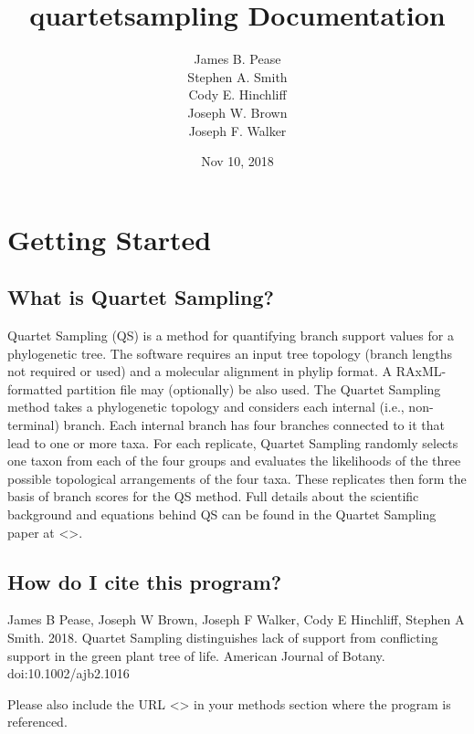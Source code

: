 \documentclass[letterpaper,12pt,english]{sphinxmanual}
\title{quartetsampling Documentation}
\date{Nov 10, 2018}
\author{James B. Pease \\ Stephen A. Smith \\ Cody E. Hinchliff \\Joseph W. Brown \\ Joseph F. Walker}
\begin{document}
\maketitle
\sphinxtableofcontents
{}\label{\detokenize{index::doc}}



\chapter{Getting Started}
\label{\detokenize{intro:intro}}\label{\detokenize{intro:getting-started}}\label{\detokenize{intro::doc}}\label{\detokenize{intro:manual-for-quartetsampling}}

\section{What is Quartet Sampling?}
\label{\detokenize{intro:what-is-quartet-sampling}}
Quartet Sampling (QS) is a method for quantifying branch support values for a phylogenetic tree.  The software requires an input tree topology (branch lengths not required or used) and a molecular alignment in phylip format.  A RAxML-formatted partition file may (optionally) be also used.  The Quartet Sampling method takes a phylogenetic topology and considers each internal (i.e., non-terminal) branch.  Each internal branch has four branches connected to it that lead to one or more taxa.  For each replicate, Quartet Sampling randomly selects one taxon from each of the four groups and evaluates the likelihoods of the three possible topological arrangements of the four taxa.  These replicates then form the basis of branch scores for the QS method.  Full details about the scientific background and equations behind QS can be found in the Quartet Sampling paper at \textless{}\textgreater{}.


\section{How do I cite this program?}
\label{\detokenize{intro:how-do-i-cite-this-program}}
James B Pease, Joseph W Brown, Joseph F Walker, Cody E Hinchliff, Stephen A Smith. 2018. Quartet Sampling distinguishes lack of support from conflicting support in the green plant tree of life. American Journal of Botany. doi:10.1002/ajb2.1016

Please also include the URL \textless{}\textgreater{} in your methods section where the program is referenced.
\end{document}
